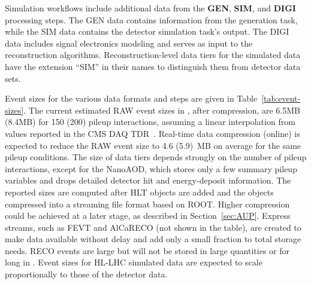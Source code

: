 Simulation workflows include additional data from the \textbf{GEN}, \textbf{SIM}, and \textbf{DIGI} processing steps. The GEN data contains information from the generation task, while the SIM data contains the detector simulation task’s output. The DIGI data includes signal electronics modeling and serves as input to the reconstruction algorithms. Reconstruction-level data tiers for the simulated data have the extension ``SIM'' in their names to distinguish them from detector data sets.  

Event sizes for the various data formats and steps are given in Table~\ref{tab:event-sizes}.
The current estimated \gls{RAW} event sizes in \RunFour, after compression, are 6.5\unit{MB} (8.4\unit{MB}) for 150 (200) pileup interactions, assuming a linear interpolation from values reported in the CMS \gls{DAQ} \gls{TDR}~\cite{CMS:2021DAQTDR}. Real-time data compression (online) is expected to reduce the \gls{RAW} event size to 4.6 (5.9)~MB on average for the same pileup conditions. The size of data tiers depends strongly on the number of pileup interactions, except for the NanoAOD, which stores only a few summary pileup variables and drops detailed detector hit and energy-deposit information. The reported sizes are computed after \gls{HLT} objects are added and the objects compressed into a streaming file format based on \textsc{ROOT}.
Higher compression could be achieved at a later stage, as described in Section~\ref{sec:AUP}. Express streams, such as \gls{FEVT} and AlCaRECO (not shown in the table), are created to make data available without delay and add only a small fraction to total storage needs. \gls{RECO} events are large but will not be stored in large quantities or for long in \PhaseTwo. Event sizes for HL-LHC simulated data are expected to scale proportionally to those of the detector data.

